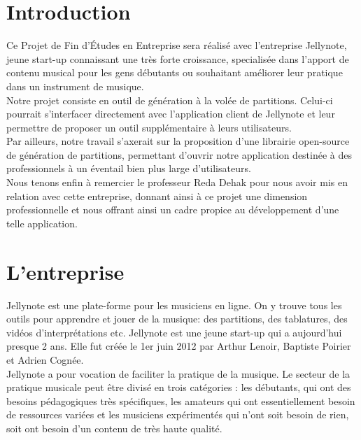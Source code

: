 \documentclass[12pt]{article}
\begin{document}



\newpage
\tableofcontents

\newpage
\clearpage

\section{Introduction}

Ce Projet de Fin d'Études en Entreprise sera réalisé avec l'entreprise Jellynote, jeune start-up connaissant une très forte croissance, specialisée dans l'apport de contenu musical pour les gens débutants ou souhaitant améliorer leur pratique dans un instrument de musique.\\

Notre projet consiste en outil de génération à la volée de partitions. Celui-ci pourrait s'interfacer directement avec l'application client de Jellynote et leur permettre de proposer un outil supplémentaire à leurs utilisateurs.\\

Par ailleurs, notre travail s'axerait sur la proposition d'une librairie open-source de génération de partitions, permettant d'ouvrir notre application destinée à des professionnels à un éventail bien plus large d'utilisateurs.\\

Nous tenons enfin à remercier le professeur Reda Dehak pour nous avoir mis en relation avec cette entreprise, donnant ainsi à ce projet une dimension professionnelle et nous offrant ainsi un cadre propice au développement d'une telle application.


\newpage
\section{L'entreprise}
Jellynote est une plate-forme pour les musiciens en ligne. On y trouve tous les outils pour apprendre et jouer de la musique: des partitions, des tablatures, des vidéos d’interprétations etc. Jellynote est une jeune start-up qui a aujourd’hui presque 2 ans. Elle fut créée le 1er juin 2012 par Arthur Lenoir, Baptiste Poirier et Adrien Cognée.\\

Jellynote a pour vocation de faciliter la pratique de la musique. Le secteur de la pratique musicale peut être divisé en trois catégories : les débutants, qui ont des besoins pédagogiques très spécifiques, les amateurs qui ont essentiellement besoin de ressources variées et les musiciens expérimentés qui n’ont soit besoin de rien, soit ont besoin d’un contenu de très haute qualité.\\
\end{document}
